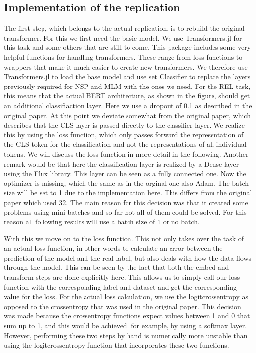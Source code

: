 \subsection{Implementation of the replication}
The first step, which belongs to the actual replication, is to rebuild the original transformer. For this we first need the basic model. We use Transformers.jl\cite{Cheng2020} for this task and some others that are still to come. This package includes some very helpful functions for handling transformers. These range from loss functions to wrappers that make it much easier to create new transformers. We therefore use Transformers.jl to load the base model and use set Classifier to replace the layers previously required for NSP and MLM with the ones we need. For the REL task, this means that the actual BERT architecture, as shown in the figure, should get an additional classifiaction layer. Here we use a dropout of 0.1 as described in the original paper. At this point we deviate somewhat from the original paper, which describes that the CLS layer is passed directly to the classifier layer. We realize this by using the loss function, which only passes forward the representation of the CLS token for the classification and not the representations of all individual tokens. We will discuss the loss function in more detail in the following. Another remark would be that here the classification layer is realized by a Dense layer using the Flux library. This layer can be seen as a fully connected one.  Now the optimizer is missing, which the same as in the orginal one also Adam. The batch size will be set to 1 due to the implementation here. This differs from the original paper which used 32. The main reason for this decision was that it created some problems using mini batches and so far not all of them could be solved. For this reason all following results will use a batch size of 1 or no batch. 

With this we move on to the loss function. This not only takes over the task of an actual loss function, in other words to calculate an error between the prediction of the model and the real label, but also deals with how the data flows through the model. This can be seen by the fact that both the embed and transform steps are done explicitly here. This allows us to simply call our loss function with the corresponding label and dataset and get the corresponding value for the loss. For the actual loss calculation, we use the logitcrossentropy as opposed to the crossentropy that was used in the original paper. This decision was made because the crossentropy functions expect values between 1 and 0 that sum up to 1, and this would be achieved, for example, by using a softmax layer. However, performing these two steps by hand is numerically more unstable than using the logitcrossentropy function that incorporates these two functions.

